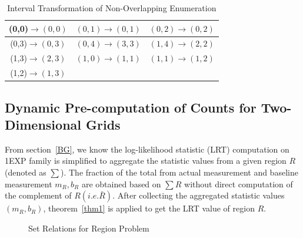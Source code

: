 \documentclass[AMA,LATO1COL]{WileyNJD-v2}
\begin{document}
\begin{table}[t]
\centering \caption{Interval Transformation of Non-Overlapping Enumeration\label{tab:op}}
     \begin{tabular}{|c|c|c|}
	\hline
    (0,0)$\rightarrow (0,0)$  &  $(0,1) \rightarrow (0,1)$&  $(0,2) \rightarrow (0,2)$ \\
    \hline
    (0,3)$\rightarrow (0,3)$  &  $(0,4) \rightarrow (3,3)$&  $(1,4) \rightarrow (2,2)$ \\
    \hline
    (1,3)$\rightarrow (2,3)$  &  $(1,0) \rightarrow (1,1)$&  $(1,1) \rightarrow (1,2)$ \\
    \hline
     (1,2)$\rightarrow (1,3)$  &    &  \\
    \hline
\end{tabular}
\label{ex-nonoverlap}
\end{table}

\subsection{Dynamic Pre-computation of Counts for Two-Dimensional Grids}
\label{sec:mov2}
From section~\ref{BG}, we know the log-likelihood statistic (LRT) computation on 1EXP family is simplified to aggregate the statistic values from a given region $R$ (denoted as $\sum $). The fraction of the total from actual measurement and baseline measurement $m_R,b_R$ are obtained based on $\sum R$ without direct computation of the complement of $R (i.e. \bar R)$. After collecting the aggregated statistic values $(m_R,b_R)$, theorem~\ref{thm1} is applied to get the LRT value of region $R$.

\begin{figure}[h]
     \begin{center}
\end{center}
\vspace{-10pt}
\caption{Set Relations for Region Problem}\label{fig:example}
\end{figure}
\end{document}

